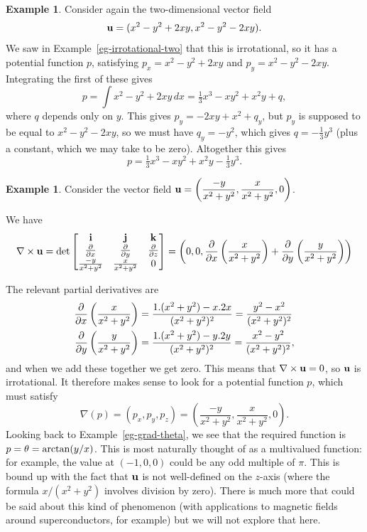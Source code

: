 \documentclass[reqno]{amsart}
\theoremstyle{definition}
\newtheorem{example}[theorem]{Example}
\begin{document}
\begin{example}
 Consider again the two-dimensional vector field
 \[ \mathbf{u} = (x^2-y^2+2xy,x^2-y^2-2xy). \]
 We saw in Example~\ref{eg-irrotational-two} that this is
 irrotational, so it has a potential function $p$, satisfying
 $p_x=x^2-y^2+2xy$ and $p_y=x^2-y^2-2xy$.  Integrating the first of
 these gives
 \[ p = \int  x^2-y^2+2xy\,dx =
     \tfrac{1}{3}x^3 - xy^2 + x^2y + q,
 \]
 where $q$ depends only on $y$.  This gives $p_y=-2xy+x^2+q_y$, but
 $p_y$ is supposed to be equal to $x^2-y^2-2xy$, so we must have
 $q_y=-y^2$, which gives $q=-\tfrac{1}{3}y^3$ (plus a constant, which
 we may take to be zero).  Altogether this gives 
 \[ p = \tfrac{1}{3}x^3 - xy^2 + x^2y - \tfrac{1}{3}y^3. \]
\end{example}
\begin{example}\label{eg-theta-potential}
 Consider the vector field 
 $\displaystyle\mathbf{u}=\left(\frac{-y}{x^2+y^2},\frac{x}{x^2+y^2},0\right)$.

 We have 
 \[ \nabla\times\mathbf{u} = 
  \det\left[\begin{matrix} \mathbf{i} & \mathbf{j} & \mathbf{k} \\
           \frac{\partial}{\partial x} &
           \frac{\partial}{\partial y} &
           \frac{\partial}{\partial z} \\
           \frac{-y}{x^2+y^2} & \frac{x}{x^2+y^2} & 0 \end{matrix}\right] = 
   \left(0,0,
    \frac{\partial}{\partial x}\left(\frac{x}{x^2+y^2}\right) +
    \frac{\partial}{\partial y}\left(\frac{y}{x^2+y^2}\right)
   \right)
 \]

 The relevant partial derivatives are 
 \begin{align*}
  \frac{\partial}{\partial x}\left(\frac{x}{x^2+y^2}\right) &= 
   \frac{1.(x^2+y^2) - x.2x}{(x^2+y^2)^2} = 
    \frac{y^2-x^2}{(x^2+y^2)^2} \\
  \frac{\partial}{\partial y}\left(\frac{y}{x^2+y^2}\right) &= 
   \frac{1.(x^2+y^2) - y.2y}{(x^2+y^2)^2} = 
    \frac{x^2-y^2}{(x^2+y^2)^2},
 \end{align*}
 and when we add these together we get zero.  This means that
 $\nabla\times\mathbf{u}=0$, so $\mathbf{u}$ is irrotational.  It therefore makes sense
 to look for a potential function $p$, which must satisfy 
 \[ \nabla(p) = (p_x,p_y,p_z) = 
     \left(\frac{-y}{x^2+y^2},\frac{x}{x^2+y^2},0\right).
 \]
 Looking back to Example~\ref{eg-grad-theta}, we see that the required
 function is $p=\theta=\arctan(y/x)$.  This is most naturally thought of
 as a multivalued function: for example, the value at $(-1,0,0)$ could
 be any odd multiple of $\pi$.  This is bound up with the fact that
 $\mathbf{u}$ is not well-defined on the $z$-axis (where the formula
 $x/(x^2+y^2)$ involves division by zero).  There is much more that
 could be said about this kind of phenomenon (with applications to
 magnetic fields around superconductors, for example) but we will not
 explore that here.
\end{example}
\end{document}
